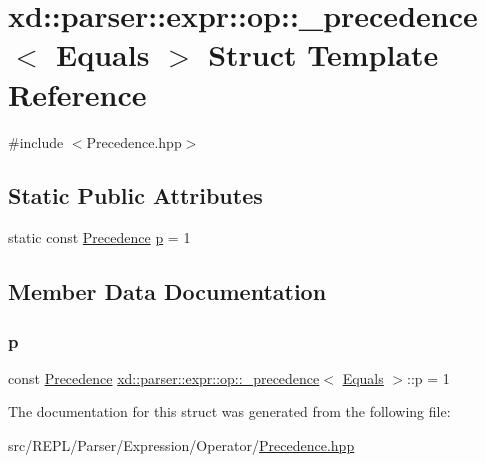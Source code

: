 \hypertarget{structxd_1_1parser_1_1expr_1_1op_1_1__precedence_3_01_equals_01_4}{}\section{xd\+:\+:parser\+:\+:expr\+:\+:op\+:\+:\+\_\+precedence$<$ Equals $>$ Struct Template Reference}
\label{structxd_1_1parser_1_1expr_1_1op_1_1__precedence_3_01_equals_01_4}


{\ttfamily \#include $<$Precedence.\+hpp$>$}

\subsection*{Static Public Attributes}
\begin{DoxyCompactItemize}
\item 
static const \mbox{\hyperlink{namespacexd_1_1parser_1_1expr_1_1op_ae27abd4a02cd8125663cb2bacac299b2}{Precedence}} \mbox{\hyperlink{structxd_1_1parser_1_1expr_1_1op_1_1__precedence_3_01_equals_01_4_aebfdd644032dc16cce65abaf993509c6}{p}} = 1
\end{DoxyCompactItemize}


\subsection{Member Data Documentation}
\mbox{\label{structxd_1_1parser_1_1expr_1_1op_1_1__precedence_3_01_equals_01_4_aebfdd644032dc16cce65abaf993509c6}} 
\subsubsection{\texorpdfstring{p}{p}}
{\footnotesize\ttfamily const \mbox{\hyperlink{namespacexd_1_1parser_1_1expr_1_1op_ae27abd4a02cd8125663cb2bacac299b2}{Precedence}} \mbox{\hyperlink{structxd_1_1parser_1_1expr_1_1op_1_1__precedence}{xd\+::parser\+::expr\+::op\+::\+\_\+precedence}}$<$ \mbox{\hyperlink{structxd_1_1parser_1_1expr_1_1op_1_1_equals}{Equals}} $>$\+::p = 1\hspace{0.3cm}{\ttfamily [static]}}



The documentation for this struct was generated from the following file\+:\begin{DoxyCompactItemize}
\item 
src/\+R\+E\+P\+L/\+Parser/\+Expression/\+Operator/\mbox{\hyperlink{_precedence_8hpp}{Precedence.\+hpp}}\end{DoxyCompactItemize}
